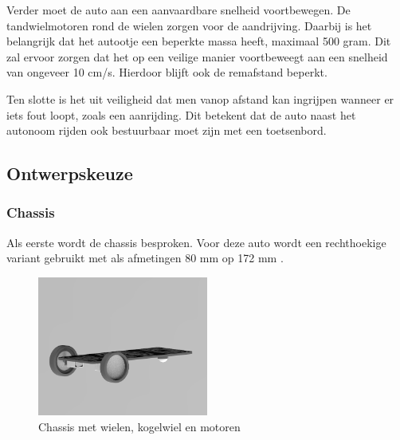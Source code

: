 \documentclass[a4paper,twoside,kulak]{kulakreport} %
\begin{document}
Verder moet de auto aan een aanvaardbare snelheid voortbewegen. De tandwielmotoren rond de wielen zorgen voor de aandrijving. Daarbij is het belangrijk dat het autootje een beperkte massa heeft, maximaal 500 gram. Dit zal ervoor zorgen dat het op een veilige manier voortbeweegt aan een snelheid van ongeveer 10 cm/s. Hierdoor blijft ook de remafstand beperkt.

Ten slotte is het uit veiligheid dat men vanop afstand kan ingrijpen wanneer er iets fout loopt, zoals een aanrijding. Dit betekent dat de auto naast het autonoom rijden ook bestuurbaar moet zijn met een toetsenbord.






\subsection{Ontwerpskeuze}
\label{Ontwerpskeuze}

\subsubsection{Chassis}
Als eerste wordt de chassis besproken. Voor deze auto wordt een rechthoekige variant gebruikt met als afmetingen 80 mm op 172 mm  \cite{RobotChassisRechthoekigZwart}. 

\begin{figure}
	\includegraphics[width=0.5\textwidth]{1chassisaAndrijving}
	\centering
	\caption{Chassis met wielen, kogelwiel en motoren}
	\label{opbouw1}
\end{figure}
\end{document}
